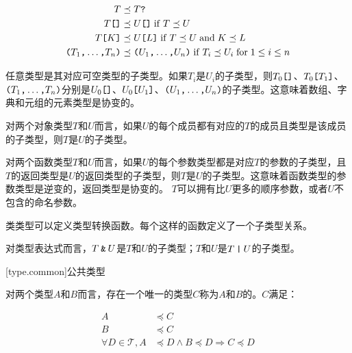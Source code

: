 \begin{equation*}
\begin{aligned}
T &\preceq T\texttt{?} \\
T\texttt{[]} &\preceq U\texttt{[]} \mathrel{\mathrm{if}} T \preceq U \\
T\texttt{[}K\texttt{]} &\preceq U\texttt{[}L\texttt{]} \mathrel{\mathrm{if}} T \preceq U \mathrel{\mathrm{and}} K \preceq L \\
\texttt{(}T_1\texttt{,} \ldots\texttt{,} T_n\texttt{)} &\preceq \texttt{(}U_1\texttt{,} \ldots\texttt{,} U_n\texttt{)} \mathrel{\mathrm{if}} T_i \preceq U_i \mathrel{\mathrm{for}} 1 \leq i \leq n \\
\end{aligned}
\end{equation*}

\pnum
任意类型是其对应可空类型的子类型。如果$T_i$是$U_i$的子类型，则$T_0\texttt{[]}$、$T_0\texttt{[}T_1\texttt{]}$、$\texttt{(}T_1\texttt{,} \ldots\texttt{,} T_n\texttt{)}$分别是$U_0\texttt{[]}$、$U_0\texttt{[}U_1\texttt{]}$、$\texttt{(}U_1\texttt{,} \ldots\texttt{,} U_n\texttt{)}$的子类型。\enternote 这意味着数组、字典和元组的元素类型是协变的。 \exitnote

\pnum
对两个对象类型$T$和$U$而言，如果$U$的每个成员都有对应的$T$的成员且类型是该成员的子类型，则$T$是$U$的子类型。

\pnum
对两个函数类型$T$和$U$而言，如果$U$的每个参数类型都是对应$T$的参数的子类型，且$T$的返回类型是$U$的返回类型的子类型，则$T$是$U$的子类型。\enternote 这意味着函数类型的参数类型是逆变的，返回类型是协变的。 \exitnote $T$可以拥有比$U$更多的顺序参数，或者$U$不包含的命名参数。

\pnum
类类型可以定义类型转换函数。每个这样的函数定义了一个子类型关系。

\pnum
对类型表达式而言，$T\mathbin{\texttt{\&}}U$是$T$和$U$的子类型；$T$和$U$是$T\mathbin{\texttt{|}}U$的子类型。

[type.common]{公共类型}

\pnum
对两个类型$A$和$B$而言，存在一个唯一的类型$C$称为$A$和$B$的。$C$满足：

\begin{equation}
\begin{aligned}
    A &\preceq C \\
    B &\preceq C \\
    \forall D \in \mathcal{T}, A &\preceq D \land B \preceq D \Rightarrow C \preceq D
\end{aligned}
\end{equation}

